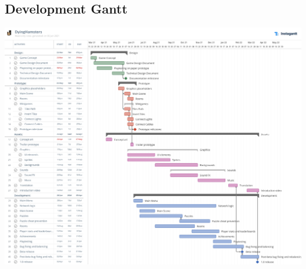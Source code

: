 \subsection{Development Gantt}

\includegraphics[height=\textwidth, angle=-90, origin=c]{../Pictures/Development/Gantt_diagram.png}

\pagebreak 